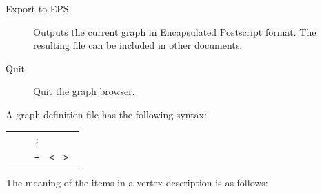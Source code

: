 \begin{isabellebody}
\begin{isamarkuptext}
\begin{description}
  \item[Export to EPS] Outputs the current graph in Encapsulated
  Postscript format. The resulting file can be included in other
  documents.

  \item[Quit] Quit the graph browser.

  \end{description}%
\end{isamarkuptext}%
\isamarkuptrue%
%
\isamarkuptrue%
%
\begin{isamarkuptext}%
A graph definition file has the following syntax:

  \begin{center}\small
  \begin{tabular}{rcl}
    \isa{graph} & \isa{{\isaliteral{22}{\isachardoublequote}}{\isaliteral{3D}{\isacharequal}}{\isaliteral{22}{\isachardoublequote}}} & \isa{{\isaliteral{22}{\isachardoublequote}}{\isaliteral{7B}{\isacharbraceleft}}\ vertex{\isaliteral{22}{\isachardoublequote}}}~\verb|;|~\isa{{\isaliteral{22}{\isachardoublequote}}{\isaliteral{7D}{\isacharbraceright}}{\isaliteral{2B}{\isacharplus}}{\isaliteral{22}{\isachardoublequote}}} \\
    \isa{vertex} & \isa{{\isaliteral{22}{\isachardoublequote}}{\isaliteral{3D}{\isacharequal}}{\isaliteral{22}{\isachardoublequote}}} & \isa{{\isaliteral{22}{\isachardoublequote}}vertex{\isaliteral{5F}{\isacharunderscore}}name\ vertex{\isaliteral{5F}{\isacharunderscore}}ID\ dir{\isaliteral{5F}{\isacharunderscore}}name\ {\isaliteral{5B}{\isacharbrackleft}}{\isaliteral{22}{\isachardoublequote}}}~\verb|+|~\isa{{\isaliteral{22}{\isachardoublequote}}{\isaliteral{5D}{\isacharbrackright}}\ path\ {\isaliteral{5B}{\isacharbrackleft}}{\isaliteral{22}{\isachardoublequote}}}~\verb|<|~\isa{{\isaliteral{22}{\isachardoublequote}}{\isaliteral{7C}{\isacharbar}}{\isaliteral{22}{\isachardoublequote}}}~\verb|>|~\isa{{\isaliteral{22}{\isachardoublequote}}{\isaliteral{5D}{\isacharbrackright}}\ {\isaliteral{7B}{\isacharbraceleft}}\ vertex{\isaliteral{5F}{\isacharunderscore}}ID\ {\isaliteral{7D}{\isacharbraceright}}{\isaliteral{2A}{\isacharasterisk}}{\isaliteral{22}{\isachardoublequote}}}
  \end{tabular}
  \end{center}

  The meaning of the items in a vertex description is as follows:

  \begin{description}
  

\end{description}
\end{isamarkuptext}
\end{isabellebody}
